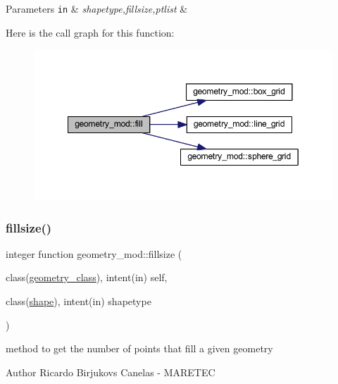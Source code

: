 \begin{DoxyParams}[1]{Parameters}
\mbox{\tt in}  & {\em shapetype,fillsize,ptlist} & \\
\hline
\end{DoxyParams}
Here is the call graph for this function\+:\nopagebreak
\begin{figure}[H]
\begin{center}
\leavevmode
\includegraphics[width=349pt]{namespacegeometry__mod_a095a8b47b3c23e154dcd31ab1441a065_cgraph}
\end{center}
\end{figure}
\mbox{\label{namespacegeometry__mod_a92602e1198d3607613ea2722fb002685}} 
\subsubsection{\texorpdfstring{fillsize()}{fillsize()}}
{\footnotesize\ttfamily integer function geometry\+\_\+mod\+::fillsize (\begin{DoxyParamCaption}\item[{class(\hyperlink{structgeometry__mod_1_1geometry__class}{geometry\+\_\+class}), intent(in)}]{self,  }\item[{class(\hyperlink{structgeometry__mod_1_1shape}{shape}), intent(in)}]{shapetype }\end{DoxyParamCaption})\hspace{0.3cm}{\ttfamily [private]}}



method to get the number of points that fill a given geometry 

\begin{DoxyAuthor}{Author}
Ricardo Birjukovs Canelas -\/ M\+A\+R\+E\+T\+EC 
\end{DoxyAuthor}

